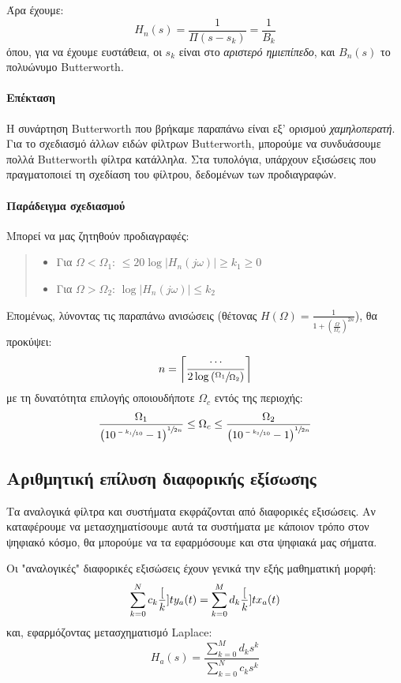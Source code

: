 \documentclass[11pt,a4paper,notitlepage,fleqn]{article}
\begin{document}
Άρα έχουμε:\[
H_n(s) = \frac{1}{Π(s-s_k)}=\frac{1}{B_k}
\]
όπου, για να έχουμε ευστάθεια, οι \( s_k \) είναι στο \emph{αριστερό ημιεπίπεδο}, και \( B_n(s) \) το
πολυώνυμο Butterworth.

\paragraph{Επέκταση}
Η συνάρτηση Butterworth που βρήκαμε παραπάνω είναι εξ' ορισμού \emph{χαμηλοπερατή}. Για το σχεδιασμό
άλλων ειδών φίλτρων Butterworth, μπορούμε να συνδυάσουμε πολλά Butterworth φίλτρα κατάλληλα. Στα
τυπολόγια, υπάρχουν εξισώσεις που πραγματοποιεί τη σχεδίαση του φίλτρου, δεδομένων των προδιαγραφών.

\paragraph{Παράδειγμα σχεδιασμού}
Μπορεί να μας ζητηθούν προδιαγραφές:
\begin{quote}
	\begin{itemize}
		\item Για \( \Omega < \Omega_1 \): \( 
		\leq 20\log\left|H_n(j\omega )\right| \geq k_1 \geq 0
		 \)
		\item Για \( \Omega > \Omega_2 \): \( 
		\log\left|H_n(j\omega )\right| \leq k_2
		\)
	\end{itemize}
\end{quote}
Επομένως, λύνοντας τις παραπάνω ανισώσεις (θέτονας \( H(\Omega) = \frac{1}{1+\left(\frac{\Omega}{\Omega_c}\right)^{2n}} \)), θα προκύψει:
\[
n = \left\lceil
\frac{\cdots}{2\log\left(\sfrac{\Omega_1}{\Omega_2} \right)}
\right\rceil
\]
με τη δυνατότητα επιλογής οποιουδήποτε \( \Omega_c \) εντός της περιοχής:
\[
\frac{\Omega_1}{\left(10^{\sfrac{-k_1}{10} } - 1\right)^{\sfrac{1}{2n} }}
\leq \Omega_c \leq 
\frac{\Omega_2}{\left(10^{\sfrac{-k_2}{10} } - 1\right)^{\sfrac{1}{2n} }}
\]

\subsection{Αριθμητική επίλυση διαφορικής εξίσωσης}
Τα αναλογικά φίλτρα και συστήματα εκφράζονται από διαφορικές εξισώσεις. Αν καταφέρουμε να μετασχηματίσουμε
αυτά τα συστήματα με κάποιον τρόπο στον ψηφιακό κόσμο, θα μπορούμε να τα εφαρμόσουμε και στα ψηφιακά
μας σήματα.

Οι "αναλογικές" διαφορικές εξισώσεις έχουν γενικά την εξής μαθηματική μορφή:
\[
\sum_{k=0}^{N} c_k \frac{[}{k}]{}{t} y_a(t) = \sum_{k=0}^{M} d_k \frac{[}{k}]{}{t} x_a(t)
\]
και, εφαρμόζοντας μετασχηματισμό Laplace:
\[
H_a(s) = \frac{\displaystyle \sum_{k=0}^{M} d_k s^k}{\displaystyle \sum_{k=0}^{N} c_k s^k}
\]
\end{document}
